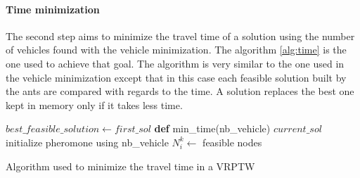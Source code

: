 \paragraph{Time minimization}
The second step aims to minimize the travel time of a solution using the number of vehicles found with the vehicle minimization. The algorithm \ref{alg:time} is the one used to achieve that goal. The algorithm is very similar to the one used in the vehicle minimization except that in this case each feasible solution built by the ants are compared with regards to the time. A solution replaces the best one kept in memory only if it takes less time.

 \begin{algorithm}
		$best\_feasible\_solution \leftarrow first\_sol$\;
	 \textbf{def} min\_time(nb\_vehicle)\;
		$current\_sol$\;
		initialize pheromone using nb\_vehicle\;
	  $N_i^k \leftarrow$ feasible nodes \;
					
\caption{Algorithm used to minimize the travel time in a VRPTW}\label{alg:time}
\end{algorithm}





